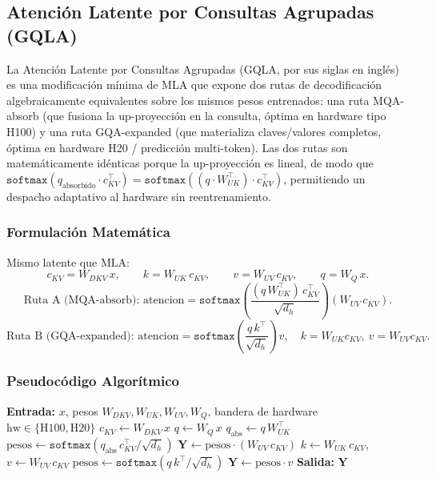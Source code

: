 \subsection{Atención Latente por Consultas Agrupadas (GQLA)}
La Atención Latente por Consultas Agrupadas (GQLA, por sus siglas en inglés) \citep{meng_gqla_2026} es una modificación mínima de MLA que expone dos rutas de decodificación algebraicamente equivalentes sobre los mismos pesos entrenados: una ruta MQA-absorb (que fusiona la up-proyección en la consulta, óptima en hardware tipo H100) y una ruta GQA-expanded (que materializa claves/valores completos, óptima en hardware H20 / predicción multi-token). Las dos rutas son matemáticamente idénticas porque la up-proyección es lineal, de modo que $\texttt{softmax}(q_{\text{absorbido}} \cdot c_{KV}^\top) = \texttt{softmax}((q \cdot W_{UK}^\top) \cdot c_{KV}^\top)$, permitiendo un despacho adaptativo al hardware sin reentrenamiento.

\subsubsection{Formulación Matemática}
Mismo latente que MLA:
\[
c_{KV} = W_{DKV}\, x, \qquad k = W_{UK}\, c_{KV}, \qquad v = W_{UV}\, c_{KV}, \qquad q = W_{Q}\, x.
\]
\[
\text{Ruta A (MQA-absorb): } \text{atencion} = \texttt{softmax}\!\left(\frac{(q\, W_{UK}^\top)\, c_{KV}^\top}{\sqrt{d_h}}\right) (W_{UV}\, c_{KV}).
\]
\[
\text{Ruta B (GQA-expanded): } \text{atencion} = \texttt{softmax}\!\left(\frac{q\, k^\top}{\sqrt{d_h}}\right) v, \quad k = W_{UK} c_{KV},\ v = W_{UV} c_{KV}.
\]

\subsubsection{Pseudocódigo Algorítmico}
\begin{algorithmic}[1]
\State \textbf{Entrada:} $x$, pesos $W_{DKV}, W_{UK}, W_{UV}, W_{Q}$, bandera de hardware $\text{hw} \in \{\text{H100}, \text{H20}\}$
\State $c_{KV} \gets W_{DKV}\, x$ 
\State $q \gets W_{Q}\, x$
 
    \State $q_{\text{abs}} \gets q\, W_{UK}^\top$ 
    \State $\text{pesos} \gets \texttt{softmax}(q_{\text{abs}}\, c_{KV}^\top / \sqrt{d_h})$
    \State $\mathbf{Y} \gets \text{pesos} \cdot (W_{UV}\, c_{KV})$
\Else {}
    \State $k \gets W_{UK}\, c_{KV}$, \quad $v \gets W_{UV}\, c_{KV}$
    \State $\text{pesos} \gets \texttt{softmax}(q\, k^\top / \sqrt{d_h})$
    \State $\mathbf{Y} \gets \text{pesos} \cdot v$
\EndIf
\State \textbf{Salida:} $\mathbf{Y}$
\end{algorithmic}

